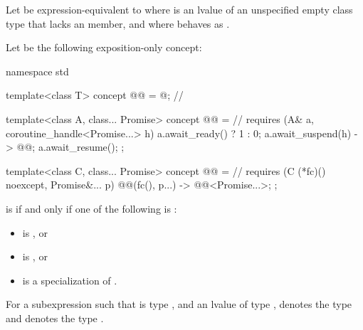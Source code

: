 Let  be
expression-equivalent to 
where  is an lvalue of
an unspecified empty class type  that
lacks an  member, and
where  behaves as
.

\pnum
Let  be the following exposition-only concept:
\begin{codeblock}
namespace std {
  template<class T>
  concept @@ = @\seebelow@;                     // \expos

  template<class A, class... Promise>
  concept @@ =                                          // \expos
    requires (A& a, coroutine_handle<Promise...> h) {
      a.await_ready() ? 1 : 0;
      { a.await_suspend(h) } -> @@;
      a.await_resume();
    };

  template<class C, class... Promise>
  concept @@ =                                        // \expos
    requires (C (*fc)() noexcept, Promise&... p) {
      { @@(fc(), p...) } -> @@<Promise...>;
    };
}
\end{codeblock}

 is 
if and only if one of the following is :
\begin{itemize}
\item {} is , or
\item {} is , or
\item {} is a specialization of .
\end{itemize}

\pnum
For a subexpression 
such that  is type , and
an lvalue  of type ,
 denotes
the type  and
 denotes
the type .

